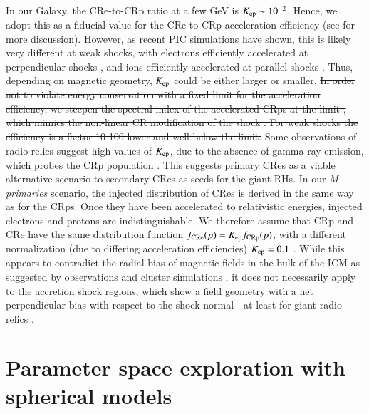 \documentclass[a4paper,fleqn,usenatbib]{mnras}
\begin{document}
In our Galaxy, the CRe-to-CRp ratio at a few GeV is $K_{{\mathrm{ep}}} \sim
10^{-2}$. Hence, we adopt this as a fiducial value for the CRe-to-CRp
acceleration efficiency (see \cite{pinzke13} for more
discussion). However, as recent PIC simulations have shown, this is
likely very different at weak shocks, with electrons efficiently
accelerated at perpendicular shocks
\citep{2014ApJ...794..153G,2014ApJ...797...47G}, and ions efficiently
accelerated at parallel shocks \citep{2014ApJ...783...91C}. Thus,
depending on magnetic geometry, $K_{{\mathrm{ep}}}$ could be either larger
or smaller. \sout{In order not to violate energy conservation with a
  fixed limit for the acceleration efficiency, we steepen the spectral
  index of the accelerated CRps at the limit %
, which  mimics the non-linear CR modification of the shock
  . For weak shocks the efficiency is a factor 10-100
  lower and well below the limit.} Some observations of radio relics
suggest high values of $K_{{\mathrm{ep}}}$, due to the absence of gamma-ray
emission, which probes the CRp population
\citep{2014MNRAS.437.2291V}. This suggests primary CRes as a viable
alternative scenario to secondary CRes as seeds for the giant RHs. In
our {\em M-primaries} scenario, the injected distribution of CRes is
derived in the same way as for the CRps. Once they have been
accelerated to relativistic energies, injected electrons and protons
are indistinguishable. We therefore assume that CRp and CRe have the
same distribution function $f_{\mathrm{CRe}}(p) = K_{\mathrm{ep}}
f_{\mathrm{CRp}}(p)$, with a different normalization (due to differing
acceleration efficiencies) $K_{\mathrm{ep}}=0.1$ \citep[which is viable for
  primarily perpendicular shocks][]{2014ApJ...794..153G}. While this
appears to contradict the radial bias of magnetic fields in the bulk
of the ICM as suggested by observations \citep{2010NatPh...6..520P}
and cluster simulations \citep{2011ApJ...740...81R}, it does not
necessarily apply to the accretion shock regions, which show a field
geometry with a net perpendicular bias with respect to the shock
normal---at least for giant radio relics \citep{2010Sci...330..347V}.



\section{Parameter space exploration with spherical models}
\end{document}
